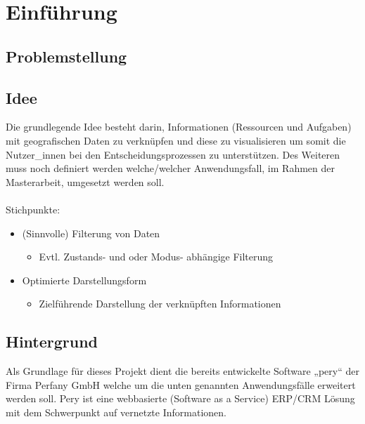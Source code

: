 \documentclass[Bachelorarbeit.tex]{subfiles}
\begin{document}
\chapter{Einführung}
\label{chap:einfuehrung}

\section{Problemstellung}
\label{chap:einfuehrung:sec:problemstellung}


\section{Idee}
\label{chap:einfuehrung:sec:idee}

Die grundlegende Idee besteht darin, Informationen (Ressourcen und Aufgaben) mit geografischen Daten zu verknüpfen und diese zu visualisieren um somit die Nutzer\_innen bei den Entscheidungsprozessen zu unterstützen. Des Weiteren muss noch definiert werden welche/welcher Anwendungsfall, im Rahmen der Masterarbeit, umgesetzt werden soll.\\
\\
Stichpunkte:
\begin{itemize}
\item (Sinnvolle) Filterung von Daten
\begin{itemize}
	\item Evtl. Zustands- und oder Modus- abhängige Filterung
\end{itemize}
\item Optimierte Darstellungsform
\begin{itemize}
	\item Zielführende Darstellung der verknüpften Informationen
\end{itemize}
\end{itemize}

\section{Hintergrund}
\label{chap:einfuehrung:sec:hintergrund}
Als Grundlage für dieses Projekt dient die bereits entwickelte Software „pery“ der Firma Perfany GmbH welche um die unten genannten Anwendungsfälle erweitert werden soll. Pery ist eine webbasierte (Software as a Service) ERP/CRM Lösung mit dem Schwerpunkt auf vernetzte Informationen. 
\end{document}
